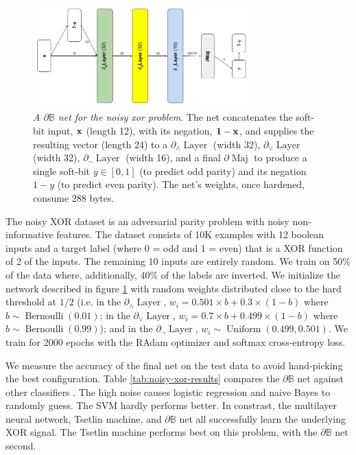 \documentclass{article}
\theoremstyle{plain}
\theoremstyle{definition}
\theoremstyle{remark}
\begin{document}
\begin{figure}
	\centering
	\includegraphics[width=0.75\textwidth]{../noisy-xor-architecture.png}
	\caption{{\em A $\partial\mathbb{B}$ net for the noisy xor problem}. The net concatenates the soft-bit input, ${\bf x}$ (length 12), with its negation, ${\bf 1 - x}$, and supplies the resulting vector (length 24) to a $\partial_{\wedge}\!\!\operatorname{Layer}$ (width 32), $\partial_{\vee}\!\!\operatorname{Layer}$ (width 32),  $\partial_{\neg} \!\operatorname{Layer}$ (width 16), and a final $\partial\!\operatorname{Maj}$ to produce a single soft-bit $y \in [0,1]$ (to predict odd parity) and its negation $1-y$ (to predict even parity). The net's weights, once hardened, consume $288$ bytes.}
	\label{fig:noisy-xor-architecture}
\end{figure}

The noisy XOR dataset \cite{noisy-xor-dataset} is an adversarial parity problem with noisy non-informative features. The dataset consists of 10K examples with 12 boolean inputs and a target label (where 0 = odd and 1 = even) that is a XOR function of 2 of the inputs. The remaining 10 inputs are entirely random. We train on 50\% of the data where, additionally, 40\% of the labels are inverted. We initialize the network described in figure \ref{fig:noisy-xor-architecture} with random weights distributed close to the hard threshold at $1/2$ (i.e. in the $\partial_{\wedge}\!\operatorname{Layer}$, $w_{i} = 0.501 \times b + 0.3 \times (1-b)$ where $b \sim \operatorname{Bernoulli}(0.01)$; in the $\partial_{\vee}\!\operatorname{Layer}$, $w_{i} = 0.7 \times b + 0.499 \times (1-b)$ where $b \sim \operatorname{Bernoulli}(0.99)$); and in the $\partial_{\neg}\!\operatorname{Layer}$, $w_{i} \sim \operatorname{Uniform}(0.499, 0.501)$. We train for 2000 epochs with the RAdam optimizer and softmax cross-entropy loss. 

We measure the accuracy of the final net on the test data to avoid hand-picking the best configuration. Table \ref{tab:noisy-xor-results} compares the $\partial\mathbb{B}$ net against other classifiers \cite{granmo18}. The high noise causes logistic regression and naive Bayes to randomly guess. The SVM hardly performs better. In constrast, the multilayer neural network, Tsetlin machine, and  $\partial\mathbb{B}$ net all successfully learn the underlying XOR signal. The Tsetlin machine performs best on this problem, with the $\partial\mathbb{B}$ net second.
\end{document}
